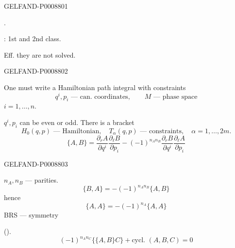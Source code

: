 \begin{GelfandAdjacentEvidence}{GELFAND-P000880}{1}

.

: 1st and 2nd class.

Eff. they are not solved.
\end{GelfandAdjacentEvidence}
\begin{GelfandAdjacentEvidence}{GELFAND-P000880}{2}


One must write a Hamiltonian path integral with constraints
\begin{equation*}
q^i,p_i\text{ --- can. coordinates},\qquad M\text{ --- phase space}
\tag{1}
\end{equation*}
$i=1,\ldots,n$.

$q^i,p_i$ can be even or odd. There is a bracket
\begin{equation*}
H_0(q,p)\text{ --- Hamiltonian},\quad T_\alpha(q,p)\text{ --- constraints},\quad
\alpha=1,\ldots,2m.
\tag{2}
\end{equation*}
\begin{equation*}
\{A,B\}=\frac{\partial_r A}{\partial q^i}\frac{\partial_\ell B}{\partial p_i}
-(-1)^{n_A n_B}\frac{\partial_r B}{\partial q^i}\frac{\partial_\ell A}{\partial p_i}
\tag{3}
\end{equation*}
\end{GelfandAdjacentEvidence}
\begin{GelfandAdjacentEvidence}{GELFAND-P000880}{3}


$n_A,n_B$ --- parities.
\begin{equation*}
\{B,A\}=-(-1)^{n_A n_B}\{A,B\}
\tag{4}
\end{equation*}
hence
\begin{equation*}
\{A,A\}=-(-1)^{n_A}\{A,A\}
\tag{5}
\end{equation*}
BRS --- symmetry

().
\begin{equation*}
(-1)^{n_A n_C}\{\{A,B\}C\}+\text{cycl. }(A,B,C)=0
\tag{6}
\end{equation*}
\end{GelfandAdjacentEvidence}
